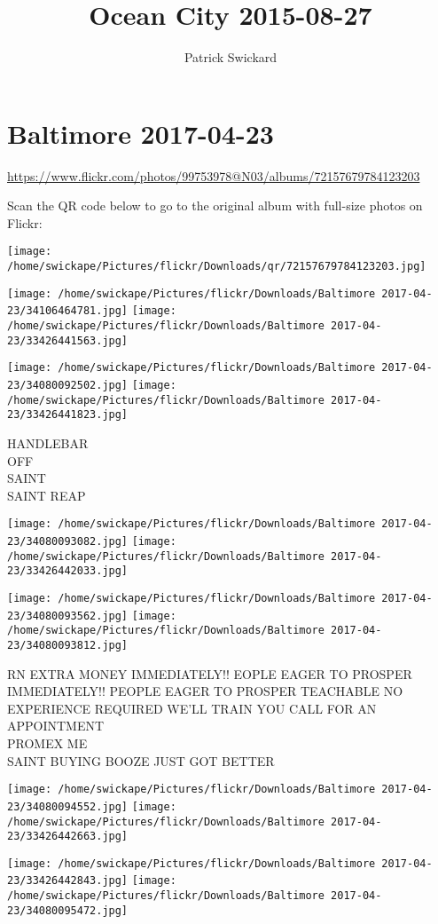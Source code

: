 \documentclass[10pt,letterpaper]{article}
\title{Ocean City 2015-08-27}
\author{Patrick Swickard}
\date{}
\begin{document}
\section*{Baltimore 2017-04-23}

\url{https://www.flickr.com/photos/99753978@N03/albums/72157679784123203}

Scan the QR code below to go to the original album with full-size photos on Flickr:

\texttt{[image: /home/swickape/Pictures/flickr/Downloads/qr/72157679784123203.jpg]}
\pagebreak

\texttt{[image: /home/swickape/Pictures/flickr/Downloads/Baltimore 2017-04-23/34106464781.jpg]}
\texttt{[image: /home/swickape/Pictures/flickr/Downloads/Baltimore 2017-04-23/33426441563.jpg]}

\texttt{[image: /home/swickape/Pictures/flickr/Downloads/Baltimore 2017-04-23/34080092502.jpg]}
\texttt{[image: /home/swickape/Pictures/flickr/Downloads/Baltimore 2017-04-23/33426441823.jpg]}

HANDLEBAR\\
OFF\\
SAINT\\
SAINT REAP
\pagebreak

\texttt{[image: /home/swickape/Pictures/flickr/Downloads/Baltimore 2017-04-23/34080093082.jpg]}
\texttt{[image: /home/swickape/Pictures/flickr/Downloads/Baltimore 2017-04-23/33426442033.jpg]}

\texttt{[image: /home/swickape/Pictures/flickr/Downloads/Baltimore 2017-04-23/34080093562.jpg]}
\texttt{[image: /home/swickape/Pictures/flickr/Downloads/Baltimore 2017-04-23/34080093812.jpg]}

RN EXTRA MONEY IMMEDIATELY!! EOPLE EAGER TO PROSPER\\
IMMEDIATELY!!  PEOPLE EAGER TO PROSPER TEACHABLE NO EXPERIENCE REQUIRED WE'LL TRAIN YOU CALL FOR AN APPOINTMENT\\
PROMEX ME\\
SAINT BUYING BOOZE JUST GOT BETTER
\pagebreak

\texttt{[image: /home/swickape/Pictures/flickr/Downloads/Baltimore 2017-04-23/34080094552.jpg]}
\texttt{[image: /home/swickape/Pictures/flickr/Downloads/Baltimore 2017-04-23/33426442663.jpg]}

\texttt{[image: /home/swickape/Pictures/flickr/Downloads/Baltimore 2017-04-23/33426442843.jpg]}
\texttt{[image: /home/swickape/Pictures/flickr/Downloads/Baltimore 2017-04-23/34080095472.jpg]}
\end{document}
